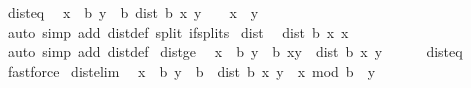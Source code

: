 \begin{isabellebody}
\isamarkupfalse%
\ dist{}{\isacharunderscore}{\kern0pt}eq{\isacharcolon}{\kern0pt}\isanewline
\ \ {\isachardoublequoteopen}{\isasymlbrakk}x\ {\isacharless}{\kern0pt}\ b{\isacharsemicolon}{\kern0pt}\ y\ {\isacharless}{\kern0pt}\ b{\isacharsemicolon}{\kern0pt}\ dist{}\ b\ x\ y\ {\isacharequal}{\kern0pt}\ {}{\isasymrbrakk}\ {\isasymLongrightarrow}\ x\ {\isacharequal}{\kern0pt}\ y{\isachardoublequoteclose}\isanewline
%
\isadelimproof
\ \ %
\endisadelimproof
%
\isatagproof
{}\isamarkupfalse%
\ {\isacharparenleft}{\kern0pt}auto\ simp\ add{\isacharcolon}{\kern0pt}\ dist{}{\isacharunderscore}{\kern0pt}def\ split{\isacharcolon}{\kern0pt}\ if{\isacharunderscore}{\kern0pt}splits{\isacharparenright}{\kern0pt}%
\endisatagproof
{\isafoldproof}%
%
\isadelimproof
\isanewline
%
\endisadelimproof
\isanewline
{}\isamarkupfalse%
\ dist{}{\isacharunderscore}{\kern0pt}{}{\isacharcolon}{\kern0pt}\isanewline
\ \ {\isachardoublequoteopen}dist{}\ b\ x\ x\ {\isacharequal}{\kern0pt}\ {}{\isachardoublequoteclose}\isanewline
%
\isadelimproof
\ \ %
\endisadelimproof
%
\isatagproof
{}\isamarkupfalse%
\ {\isacharparenleft}{\kern0pt}auto\ simp\ add{\isacharcolon}{\kern0pt}\ dist{}{\isacharunderscore}{\kern0pt}def{\isacharparenright}{\kern0pt}%
\endisatagproof
{\isafoldproof}%
%
\isadelimproof
\isanewline
%
\endisadelimproof
\isanewline
{}\isamarkupfalse%
\ dist{}{\isacharunderscore}{\kern0pt}ge{}{\isacharcolon}{\kern0pt}\isanewline
\ \ {\isachardoublequoteopen}{\isasymlbrakk}x\ {\isacharless}{\kern0pt}\ b{\isacharsemicolon}{\kern0pt}\ y\ {\isacharless}{\kern0pt}\ b{\isacharsemicolon}{\kern0pt}\ x{\isasymnoteq}y{\isasymrbrakk}\ {\isasymLongrightarrow}\ dist{}\ b\ x\ y\ {\isasymge}\ {}{\isachardoublequoteclose}\isanewline
%
\isadelimproof
\ \ %
\endisadelimproof
%
\isatagproof
{}\isamarkupfalse%
\ dist{}{\isacharunderscore}{\kern0pt}eq\ \isamarkupfalse%
\ fastforce%
\endisatagproof
{\isafoldproof}%
%
\isadelimproof
\isanewline
%
\endisadelimproof
\isanewline
{}\isamarkupfalse%
\ dist{}{\isacharunderscore}{\kern0pt}elim{\isacharunderscore}{\kern0pt}{}{\isacharcolon}{\kern0pt}\isanewline
\ \ {\isachardoublequoteopen}{\isasymlbrakk}x\ {\isacharless}{\kern0pt}\ b{\isacharsemicolon}{\kern0pt}\ y\ {\isacharless}{\kern0pt}\ b{\isasymrbrakk}\ {\isasymLongrightarrow}\ {\isacharparenleft}{\kern0pt}dist{}\ b\ x\ y\ {\isacharplus}{\kern0pt}\ x{\isacharparenright}{\kern0pt}\ mod\ b\ {\isacharequal}{\kern0pt}\ y{\isachardoublequoteclose}\isanewline

\end{isabellebody}
